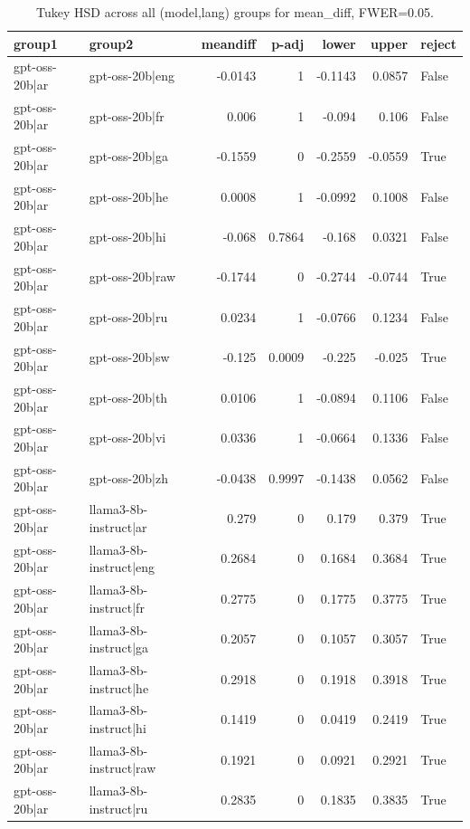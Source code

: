 \begin{table}
\caption{Tukey HSD across all (model,lang) groups for mean_diff, FWER=0.05.}
\label{tab:tukey_all_models_all_langs_mean_diff}
\begin{tabular}{l l r r r r l}
\toprule
group1 & group2 & meandiff & p-adj & lower & upper & reject \\
\midrule
gpt-oss-20b|ar & gpt-oss-20b|eng & -0.0143 & 1 & -0.1143 & 0.0857 & False \\
gpt-oss-20b|ar & gpt-oss-20b|fr & 0.006 & 1 & -0.094 & 0.106 & False \\
gpt-oss-20b|ar & gpt-oss-20b|ga & -0.1559 & 0 & -0.2559 & -0.0559 & True \\
gpt-oss-20b|ar & gpt-oss-20b|he & 0.0008 & 1 & -0.0992 & 0.1008 & False \\
gpt-oss-20b|ar & gpt-oss-20b|hi & -0.068 & 0.7864 & -0.168 & 0.0321 & False \\
gpt-oss-20b|ar & gpt-oss-20b|raw & -0.1744 & 0 & -0.2744 & -0.0744 & True \\
gpt-oss-20b|ar & gpt-oss-20b|ru & 0.0234 & 1 & -0.0766 & 0.1234 & False \\
gpt-oss-20b|ar & gpt-oss-20b|sw & -0.125 & 0.0009 & -0.225 & -0.025 & True \\
gpt-oss-20b|ar & gpt-oss-20b|th & 0.0106 & 1 & -0.0894 & 0.1106 & False \\
gpt-oss-20b|ar & gpt-oss-20b|vi & 0.0336 & 1 & -0.0664 & 0.1336 & False \\
gpt-oss-20b|ar & gpt-oss-20b|zh & -0.0438 & 0.9997 & -0.1438 & 0.0562 & False \\
gpt-oss-20b|ar & llama3-8b-instruct|ar & 0.279 & 0 & 0.179 & 0.379 & True \\
gpt-oss-20b|ar & llama3-8b-instruct|eng & 0.2684 & 0 & 0.1684 & 0.3684 & True \\
gpt-oss-20b|ar & llama3-8b-instruct|fr & 0.2775 & 0 & 0.1775 & 0.3775 & True \\
gpt-oss-20b|ar & llama3-8b-instruct|ga & 0.2057 & 0 & 0.1057 & 0.3057 & True \\
gpt-oss-20b|ar & llama3-8b-instruct|he & 0.2918 & 0 & 0.1918 & 0.3918 & True \\
gpt-oss-20b|ar & llama3-8b-instruct|hi & 0.1419 & 0 & 0.0419 & 0.2419 & True \\
gpt-oss-20b|ar & llama3-8b-instruct|raw & 0.1921 & 0 & 0.0921 & 0.2921 & True \\
gpt-oss-20b|ar & llama3-8b-instruct|ru & 0.2835 & 0 & 0.1835 & 0.3835 & True \\

\end{tabular}
\end{table}
